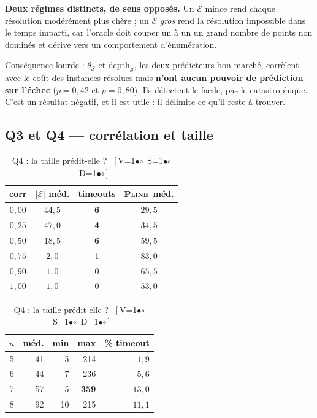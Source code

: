 \documentclass[11pt,a4paper]{article}
\theoremstyle{plain}
\theoremstyle{remark}
\newcommand{\Ecal}{\mathcal{E}}
\newcommand{\Scal}{\mathcal{S}}
\newcommand{\ILP}{\textsc{Pline}}
\newcommand{\cfgm}[1]{\ifnum#1=1$\bullet$\else$\circ$\fi}
\newcommand{\conf}[3]{%
  \textsf{\footnotesize[\,V\cfgm{#1}\ S\cfgm{#2}\ D\cfgm{#3}\,]}}
\begin{document}
\noindent
\textbf{Deux régimes distincts, de sens opposés.} Un $\Ecal$ mince rend
chaque résolution modérément plus chère ; un $\Ecal$ \emph{gros} rend la
résolution impossible dans le temps imparti, car l'oracle doit couper un à un
un grand nombre de points non dominés et dérive vers un comportement
d'énumération.

Conséquence lourde : $\theta_{\Scal}$ et $\text{depth}_{\Scal}$, les deux
prédicteurs bon marché, corrèlent avec le coût des instances résolues mais
\textbf{n'ont aucun pouvoir de prédiction sur l'échec} ($p=0{,}42$ et
$p=0{,}80$). Ils détectent le facile, pas le catastrophique. C'est un
résultat négatif, et il est utile : il délimite ce qu'il reste à trouver.

\subsection{Q3 et Q4 --- corrélation et taille}

\begin{table}[H]
\centering
\begin{minipage}{0.48\textwidth}
\centering
\caption{Q3 : expérience contrôlée sur corr.\ \conf{0}{0}{0}}
\begin{tabular}{cccc}
\toprule
corr & $|\Ecal|$ méd. & timeouts & \ILP\ méd.\\
\midrule
$0{,}00$ & $44{,}5$ & \textbf{6} & $29{,}5$\\
$0{,}25$ & $47{,}0$ & \textbf{4} & $34{,}5$\\
$0{,}50$ & $18{,}5$ & \textbf{6} & $59{,}5$\\
$0{,}75$ & $2{,}0$ & 1 & $83{,}0$\\
$0{,}90$ & $1{,}0$ & 0 & $65{,}5$\\
$1{,}00$ & $1{,}0$ & 0 & $53{,}0$\\
\bottomrule
\end{tabular}
\end{minipage}
\hfill
\begin{minipage}{0.48\textwidth}
\centering
\caption{Q4 : la taille prédit-elle ?\ \conf{0}{0}{0}}
\begin{tabular}{crrrr}
\toprule
$n$ & méd. & min & max & \% timeout\\
\midrule
5 & 41 & 5 & 214 & $1{,}9$\\
6 & 44 & 7 & 236 & $5{,}6$\\
7 & 57 & 5 & \textbf{359} & $13{,}0$\\
8 & 92 & 10 & 215 & $11{,}1$\\
\bottomrule
\end{tabular}
\end{minipage}
\end{table}
\end{document}
